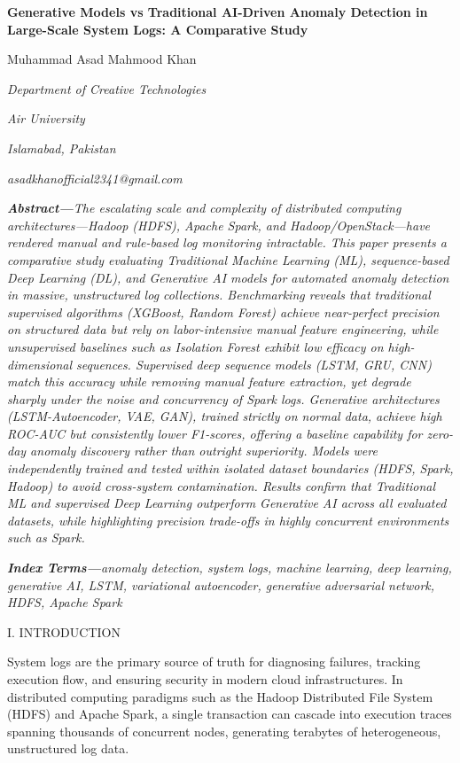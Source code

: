 \documentclass[
  11pt,
]{article}
\author{}
\date{}
\begin{document}
\textbf{Generative Models vs Traditional AI-Driven Anomaly Detection in
Large-Scale System Logs: A Comparative Study}

Muhammad Asad Mahmood Khan

\emph{Department of Creative Technologies}

\emph{Air University}

\emph{Islamabad, Pakistan}

\emph{asadkhanofficial2341@gmail.com}

\emph{\textbf{Abstract---}The escalating scale and complexity of
distributed computing architectures---Hadoop (HDFS), Apache Spark, and
Hadoop/OpenStack---have rendered manual and rule-based log monitoring
intractable. This paper presents a comparative study evaluating
Traditional Machine Learning (ML), sequence-based Deep Learning (DL),
and Generative AI models for automated anomaly detection in massive,
unstructured log collections. Benchmarking reveals that traditional
supervised algorithms (XGBoost, Random Forest) achieve near-perfect
precision on structured data but rely on labor-intensive manual feature
engineering, while unsupervised baselines such as Isolation Forest
exhibit low efficacy on high-dimensional sequences. Supervised deep
sequence models (LSTM, GRU, CNN) match this accuracy while removing
manual feature extraction, yet degrade sharply under the noise and
concurrency of Spark logs. Generative architectures (LSTM-Autoencoder,
VAE, GAN), trained strictly on normal data, achieve high ROC-AUC but
consistently lower F1-scores, offering a baseline capability for
zero-day anomaly discovery rather than outright superiority. Models were
independently trained and tested within isolated dataset boundaries
(HDFS, Spark, Hadoop) to avoid cross-system contamination. Results
confirm that Traditional ML and supervised Deep Learning outperform
Generative AI across all evaluated datasets, while highlighting
precision trade-offs in highly concurrent environments such as Spark.}

\emph{\textbf{Index Terms---}anomaly detection, system logs, machine
learning, deep learning, generative AI, LSTM, variational autoencoder,
generative adversarial network, HDFS, Apache Spark}

\textsc{I. INTRODUCTION}

System logs are the primary source of truth for diagnosing failures,
tracking execution flow, and ensuring security in modern cloud
infrastructures. In distributed computing paradigms such as the Hadoop
Distributed File System (HDFS) and Apache Spark, a single transaction
can cascade into execution traces spanning thousands of concurrent
nodes, generating terabytes of heterogeneous, unstructured log data.
\end{document}
